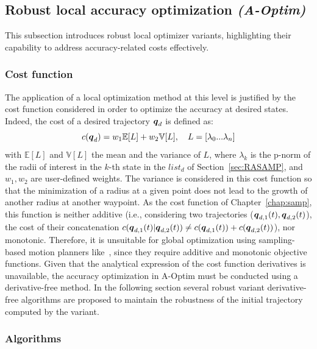 \subsection{Robust local accuracy optimization \emph{(A-Optim)} }\label{sec:AOptim}

This subsection introduces robust local optimizer variants, highlighting their capability to address accuracy-related costs effectively.

\subsubsection{Cost function}\label{sec:AOptimCost}

The application of a local optimization method at this level is justified by the cost function considered in order to optimize the accuracy at desired states. 
Indeed, the cost of a desired trajectory $\boldsymbol{q}_d$ is defined as:
\begin{equation}\label{eq: cost}
    c(\boldsymbol{q}_d) = w_1\mathbb{E}[L] + w_2\mathbb{V}[L], \quad L = \left[\lambda_{0} ... \lambda_n \right]
\end{equation}
with $\mathbb{E}[L]$ and $\mathbb{V}[L]$ the mean and the variance of $L$, where $\lambda_k$ is the p-norm of the radii of interest in the $k$-th state in the $list_{d}$ of Section~\ref{sec:RASAMP}, and $w_1, w_2$ are user-defined weights.
The variance is considered in this cost function so that the minimization of a radius at a given point does not lead to the growth of another radius at another waypoint.
As the cost function of Chapter~\ref{chap:samp}, this function is neither additive (i.e., considering two trajectories ($\boldsymbol{q}_{d,1}(t), \boldsymbol{q}_{d,2}(t)$), the cost of their concatenation $c(\boldsymbol{q}_{d,1}(t)|\boldsymbol{q}_{d,2}(t)) \neq c(\boldsymbol{q}_{d,1}(t)) + c(\boldsymbol{q}_{d,2}(t))$), nor monotonic. 
Therefore, it is unsuitable for global optimization using sampling-based motion planners like~\cite{cRRT,cRRTstar}, since they require additive and monotonic objective functions.
Given that the analytical expression of the cost function derivatives is unavailable, the accuracy optimization in A-Optim must be conducted using a derivative-free method.
In the following section several robust variant derivative-free algorithms are proposed to maintain the robustness of the initial trajectory computed by the  variant.

\subsubsection{Algorithms}


